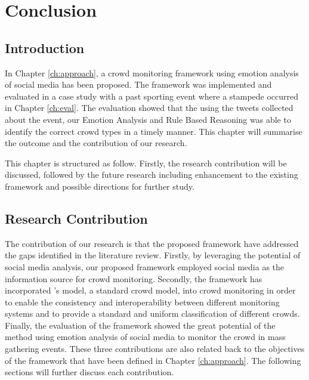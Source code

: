 \chapter{Conclusion}
\label{ch:conclusion}
\ifpdf
    \graphicspath{{Chapter6/Figs/Raster/}{Chapter6/Figs/PDF/}{Chapter6/Figs/}}
\else
    \graphicspath{{Chapter6/Figs/Vector/}{Chapter6/Figs/}}
\fi

\section{Introduction}

In Chapter \ref{ch:approach}, a crowd monitoring framework using emotion analysis of social media has been proposed. The framework was implemented and evaluated in a case study with a past sporting event where a stampede occurred in Chapter \ref{ch:eval}. The evaluation showed that the using the tweets collected about the event, our Emotion Analysis and Rule Based Reasoning was able to identify the correct crowd types in a timely manner. This chapter will summarise the outcome and the contribution of our research.

This chapter is structured as follow. Firstly, the research contribution will be discussed, followed by the future research including enhancement to the existing framework and possible directions for further study.

\section{Research Contribution}
The contribution of our research is that the proposed framework have addressed the gaps identified in the literature review. Firstly, by leveraging the potential of social media analysis, our proposed framework employed social media as the information source for crowd monitoring. Secondly, the framework has incorporated \citet{Berlonghi1995}'s model, a standard crowd model, into crowd monitoring in order to enable the consistency and interoperability between different monitoring systems and to provide a standard and uniform classification of different crowds. Finally, the evaluation of the framework showed the great potential of the method using emotion analysis of social media to monitor the crowd in mass gathering events. These three contributions are also related back to the objectives of the framework that have been defined in Chapter \ref{ch:approach}. The following sections will further discuss each contribution.


